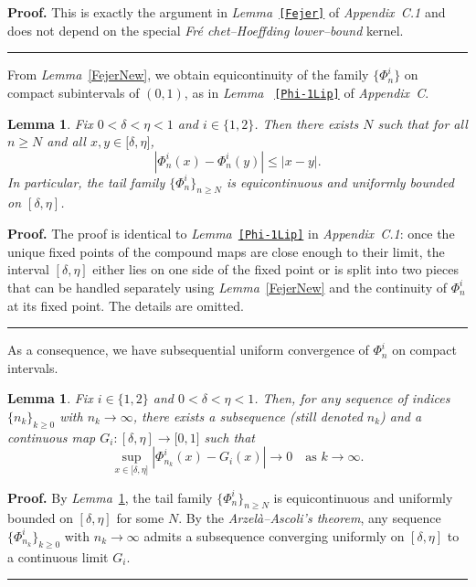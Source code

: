 \documentclass[onecolumn]{article}
\newtheorem{lemma}[theorem]{Lemma}
\newenvironment{proof}[1][Proof]{\noindent\textbf{#1.} }{\ \rule{0.5em}{0.5em}}
\begin{document}
\begin{proof}
This is exactly the argument in \textit{Lemma}~\texttt{\textup{\ref{Fejer}}}
of \textit{Appendix~C.1} and does not depend on the special \textit{Fr\'{e}%
chet--Hoeffding lower--bound} kernel.
\end{proof}

From \textit{Lemma}~\ref{FejerNew}, we obtain equicontinuity of the family $%
\{\Phi _{n}^{i}\}$ on compact subintervals of $(0,1)$, as in \textit{Lemma}~%
\texttt{\textup{\ref{Phi-1Lip}}} of \textit{Appendix~C}.

\begin{lemma}
\label{Phi-equicont} Fix $0<\delta <\eta <1$ and $i\in \{1,2\}$. Then there
exists $N$ such that for all $n\geq N$ and all $x,y\in \lbrack \delta ,\eta
] $, 
\begin{equation}
|\Phi _{n}^{i}(x)-\Phi _{n}^{i}(y)|\leq |x-y|.  \label{918}
\end{equation}%
In particular, the tail family $\{\Phi _{n}^{i}\}_{n\geq N}$ is
equicontinuous and uniformly bounded on $[\delta ,\eta ]$.
\end{lemma}

\begin{proof}
The proof is identical to \textit{Lemma}~\texttt{\textup{\ref{Phi-1Lip}}} in 
\textit{Appendix~C.1}: once the unique fixed points of the compound maps are
close enough to their limit, the interval $[\delta ,\eta ]$ either lies on
one side of the fixed point or is split into two pieces that can be handled
separately using \textit{Lemma}~\ref{FejerNew} and the continuity of $\Phi
_{n}^{i}$ at its fixed point. The details are omitted.
\end{proof}

As a consequence, we have subsequential uniform convergence of $\Phi
_{n}^{i} $ on compact intervals.

\begin{lemma}
\label{Phi-subseq} Fix $i\in \{1,2\}$ and $0<\delta <\eta <1$. Then, for any
sequence of indices $\{n_{k}\}_{k\geq 0}$ with $n_{k}\rightarrow \infty $,
there exists a subsequence (still denoted $n_{k}$) and a continuous map $%
G_{i}:[\delta ,\eta ]\rightarrow \lbrack 0,1]$ such that 
\begin{equation}
\sup_{x\in \lbrack \delta ,\eta ]}|\Phi _{n_{k}}^{i}(x)-G_{i}(x)|\rightarrow
0\quad \text{as }k\rightarrow \infty .  \label{919}
\end{equation}
\end{lemma}

\begin{proof}
By \textit{Lemma}~\ref{Phi-equicont}, the tail family $\{\Phi
_{n}^{i}\}_{n\geq N}$ is equicontinuous and uniformly bounded on $[\delta
,\eta ]$ for some $N$. By the \textit{Arzel\`{a}--Ascoli's theorem}, any
sequence $\{\Phi _{n_{k}}^{i}\}_{k\geq 0}$ with $n_{k}\rightarrow \infty $
admits a subsequence converging uniformly on $[\delta ,\eta ]$ to a
continuous limit $G_{i}$.\hfill
\end{proof}
\end{document}
